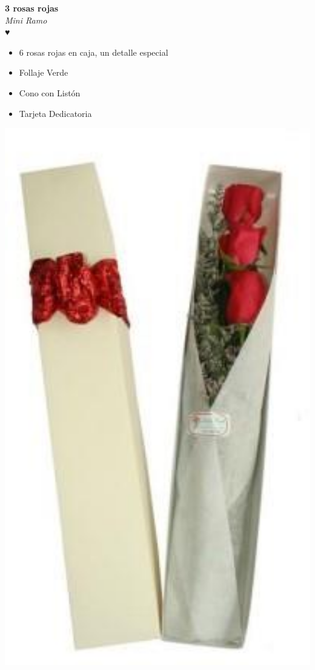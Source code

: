 \documentclass{article}
\begin{document}
\begin{minipage}{0.6\textwidth}
    \textcolor{cpred}{\textbf{\huge 3 rosas rojas }}\\
    {\textit{Mini Ramo}} \\
    \textcolor{cpred}{\Huge ♥} \\
    \vspace{0.5cm}
    \begin{itemize}
        \item 6 rosas rojas en caja, un detalle especial
        \item Follaje Verde
        \item Cono con Listón
        \item Tarjeta Dedicatoria
    \end{itemize}
\end{minipage}
\hspace{1cm}
\begin{minipage}{0.35\textwidth}
    \includegraphics[width=1.0\textwidth]{imagenes_extraidas/image_5_5}
\end{minipage}
\end{document}
